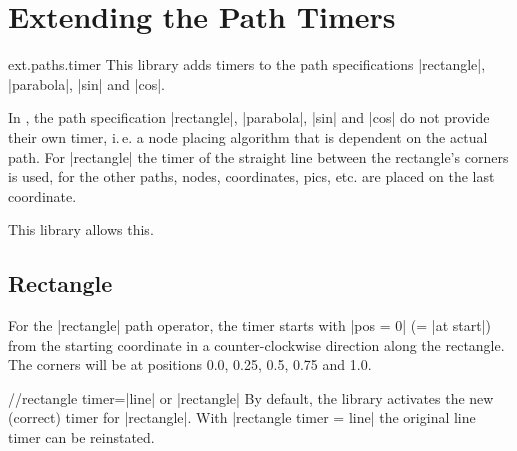 %
%
%

\section{Extending the Path Timers}
\label{library:timer}

\begin{tikzlibrary}{ext.paths.timer}
  This library adds timers to the path specifications |rectangle|, |parabola|, |sin| and |cos|.
  
\end{tikzlibrary}

In \tikzname, the path specification |rectangle|, |parabola|, |sin| and |cos| do not provide
their own timer, i.\,e. a node placing algorithm that is dependent on the actual path.
For |rectangle| the timer of the straight line between the rectangle's corners is used, for
the other paths, nodes, coordinates, pics, etc. are placed on the last coordinate.

This library allows this.

\subsection{Rectangle}

For the |rectangle| path operator, the timer starts with |pos = 0| (= |at start|) from
the starting coordinate in a counter-clockwise direction along the rectangle.
The corners will be at positions 0.0, 0.25, 0.5, 0.75 and 1.0.

\begin{key}{/\tikzext/rectangle timer=|line| or |rectangle|}
By default, the library activates the new (correct) timer for |rectangle|.
With |rectangle timer = line| the original line timer can be reinstated.
\end{key}
\begin{codeexample}[width=10cm,preamble=\usetikzlibrary{ext.paths.timer}]
\end{codeexample}

